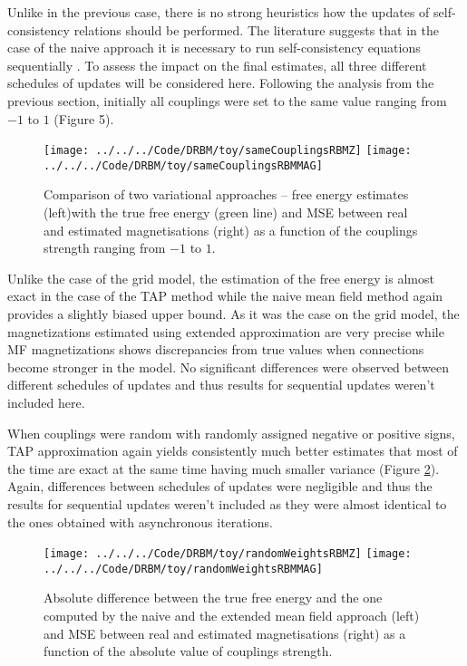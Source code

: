 Unlike in the previous case, there is no strong heuristics how the updates of self-consistency relations should be performed. The literature suggests that in the case of the naive approach it is necessary to run self-consistency equations sequentially \cite{welling2002new}. To assess the impact on the final estimates, all three different schedules of updates will be considered here. Following the analysis from the previous section, initially all couplings were set to the same value ranging from $-1$ to $1$  (Figure 5).
\begin{figure}[!htb]
%
\texttt{[image: ../../../Code/DRBM/toy/sameCouplingsRBMZ]}
\endminipage 
{}  
\texttt{[image: ../../../Code/DRBM/toy/sameCouplingsRBMMAG]}
\endminipage\hfill
\label{fig:rbmSame}
  \caption[Results on RBM toy model with uniform couplings' strength]{Comparison of two  variational approaches -- free energy estimates (left)with the true free energy (green line) and MSE between real and estimated magnetisations (right) as a function of the couplings strength ranging from $-1$ to $1$.}
\end{figure}

Unlike the case of the grid model, the estimation of the free energy is almost exact in the case of the TAP method while the naive mean field method again provides a slightly biased upper bound. As it was the case on the grid model, the magnetizations estimated using extended approximation are very precise while MF magnetizations shows discrepancies from true values when connections become stronger in the model. No significant differences were observed between different schedules of updates and thus results for sequential updates weren't included here.

When couplings were random with randomly assigned negative or positive signs, TAP approximation again yields consistently much better estimates that most of the time are exact at the same time having much smaller variance (Figure \ref{fig:rbmRandom}). Again, differences between schedules of updates were negligible and thus the results for sequential updates weren't included as they were almost identical to the ones obtained with asynchronous iterations.
\begin{figure}[!htb]
%
\texttt{[image: ../../../Code/DRBM/toy/randomWeightsRBMZ]}
\endminipage 
{}  
\texttt{[image: ../../../Code/DRBM/toy/randomWeightsRBMMAG]}
\endminipage\hfill
  \caption[Results on RBM toy model with random couplings' strength]{Absolute difference between the true free energy and the one computed by the naive and the extended mean field approach (left) and MSE between real and estimated magnetisations (right) as a function of the absolute value of couplings strength.}
  \label{fig:rbmRandom}
\end{figure}

